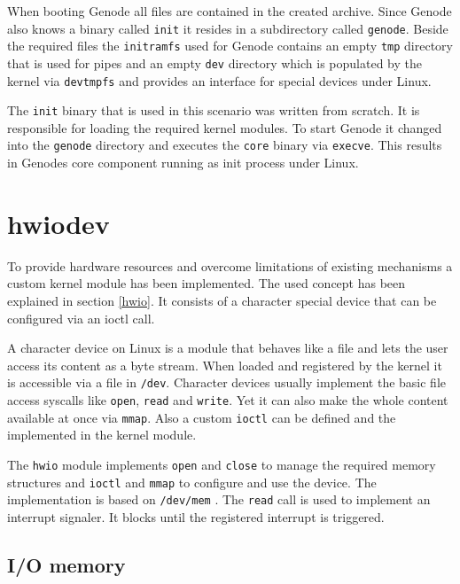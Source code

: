 \documentclass[
a4paper,
11pt,
twoside
]{report}
\begin{document}
		When booting Genode all files are contained in the created archive.
		Since Genode also knows a binary called \texttt{init} it resides in a subdirectory called \texttt{genode}.
		Beside the required files the \texttt{initramfs} used for Genode contains an empty \texttt{tmp} directory that is used for pipes and an empty \texttt{dev} directory which is populated by the kernel via \texttt{devtmpfs} and provides an interface for special devices under Linux.
		
		The \texttt{init} binary that is used in this scenario was written from scratch.
		It is responsible for loading the required kernel modules.
		To start Genode it changed into the \texttt{genode} directory and executes the \texttt{core} binary via \texttt{execve}.
		This results in Genodes core component running as init process under Linux.
		
		\section{hwiodev}
		\label{hwiodev}
		
		To provide hardware resources and overcome limitations of existing mechanisms a custom kernel module has been implemented.
		The used concept has been explained in section \ref{hwio}.
		It consists of a character special device that can be configured via an ioctl call.
		
		A character device on Linux is a module that behaves like a file and lets the user access its content as a byte stream.
		When loaded and registered by the kernel it is accessible via a file in \texttt{/dev}.
		Character devices usually implement the basic file access syscalls like \texttt{open}, \texttt{read} and \texttt{write}.
		Yet it can also make the whole content available at once via \texttt{mmap}.
		Also a custom \texttt{ioctl} can be defined and the implemented in the kernel module. \citep{books/daglib/0012446}
		
		The \texttt{hwio} module implements \texttt{open} and \texttt{close} to manage the required memory structures and \texttt{ioctl} and \texttt{mmap} to configure and use the device.
		The implementation is based on \texttt{/dev/mem} \citep{devmem}.
		The \texttt{read} call is used to implement an interrupt signaler.
		It blocks until the registered interrupt is triggered.
		
		\subsection{I/O memory}
		\label{hwioiomem}
		
\end{document}
